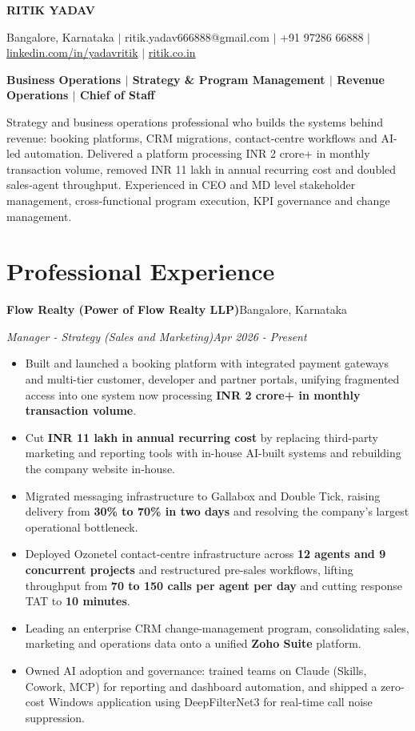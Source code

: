 \documentclass[10pt,a4paper]{article}
\newcommand{\role}[2]{\textbf{#1}\hfill#2\par}
\newcommand{\designation}[2]{\textit{#1}\hfill\textit{#2}\par\vspace{1pt}}
\begin{document}
{\LARGE\bfseries RITIK YADAV}\par
\vspace{2pt}
Bangalore, Karnataka $|$ ritik.yadav666888@gmail.com $|$ +91 97286 66888 $|$
\href{https://www.linkedin.com/in/yadavritik/}{linkedin.com/in/yadavritik} $|$
\href{https://ritik.co.in}{ritik.co.in}\par
\vspace{3pt}
\textbf{Business Operations $|$ Strategy \& Program Management $|$ Revenue Operations $|$ Chief of Staff}\par
\vspace{4pt}

Strategy and business operations professional who builds the systems behind revenue: booking platforms, CRM
migrations, contact-centre workflows and AI-led automation. Delivered a platform processing INR 2 crore+ in monthly
transaction volume, removed INR 11 lakh in annual recurring cost and doubled sales-agent throughput. Experienced in
CEO and MD level stakeholder management, cross-functional program execution, KPI governance and change management.

\section{Professional Experience}

\role{Flow Realty (Power of Flow Realty LLP)}{Bangalore, Karnataka}
\designation{Manager - Strategy (Sales and Marketing)}{Apr 2026 - Present}
\begin{itemize}
  \item Built and launched a booking platform with integrated payment gateways and multi-tier customer, developer and
        partner portals, unifying fragmented access into one system now processing \textbf{INR 2 crore+ in monthly
        transaction volume}.
  \item Cut \textbf{INR 11 lakh in annual recurring cost} by replacing third-party marketing and reporting tools with
        in-house AI-built systems and rebuilding the company website in-house.
  \item Migrated messaging infrastructure to Gallabox and Double Tick, raising delivery from \textbf{30\% to 70\% in two
        days} and resolving the company's largest operational bottleneck.
  \item Deployed Ozonetel contact-centre infrastructure across \textbf{12 agents and 9 concurrent projects} and
        restructured pre-sales workflows, lifting throughput from \textbf{70 to 150 calls per agent per day} and cutting
        response TAT to \textbf{10 minutes}.
  \item Leading an enterprise CRM change-management program, consolidating sales, marketing and operations data onto a
        unified \textbf{Zoho Suite} platform.
  \item Owned AI adoption and governance: trained teams on Claude (Skills, Cowork, MCP) for reporting and dashboard
        automation, and shipped a zero-cost Windows application using DeepFilterNet3 for real-time call noise
        suppression.
\end{itemize}
\end{document}
